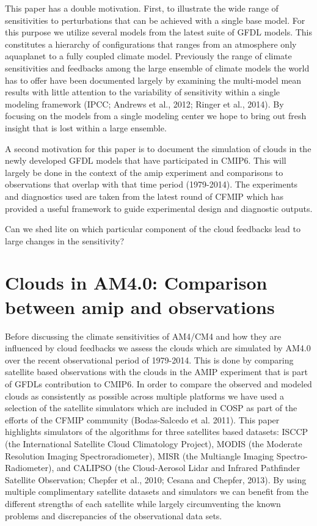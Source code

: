 \documentclass[11pt]{article}   	%
\begin{document}
This paper has a double motivation.  First, to illustrate the wide range of sensitivities to perturbations 
that can be achieved with a single base model.  For this purpose we utilize several models from the latest suite of GFDL 
models.  This constitutes a hierarchy of configurations that ranges from an atmosphere only aquaplanet to a fully coupled 
climate model.  Previously the range of climate sensitivities and feedbacks among the large ensemble of climate models 
the world has to offer have been documented largely by examining the multi-model mean results with little attention to 
the variability of sensitivity within a single modeling framework (IPCC; Andrews et al., 2012; Ringer et al., 2014).  By 
focusing on the models from a single modeling center we hope to bring out fresh insight that is lost within a large ensemble.

A second motivation for this paper is to document the simulation of clouds in the newly developed GFDL models that 
have participated in CMIP6.  This will largely be done in the context of the amip experiment and comparisons to observations
that overlap with that time period (1979-2014).  The experiments and diagnostics used are taken from the latest 
round of CFMIP which has provided a useful framework to guide experimental design and diagnostic outputs.       

Can we shed lite on which particular component of the cloud feedbacks lead to large changes in the sensitivity?  

\section{Clouds in AM4.0: Comparison between amip and observations}

Before discussing the climate sensitivities of AM4/CM4 and how they are influenced by cloud feedbacks we assess
the clouds which are simulated by AM4.0 over the recent observational period of 1979-2014.  This is done by comparing
satellite based observations with the clouds in the AMIP experiment that is part of GFDLs contribution to CMIP6.  In 
order to compare the observed and modeled clouds as consistently as possible across multiple platforms we have 
used a selection of the satellite simulators which are included in COSP as part of the efforts of the CFMIP community 
(Bodas-Salcedo et al. 2011).  This paper highlights simulators of the algorithms for three satellites based datasets: 
ISCCP (the International Satellite Cloud Climatology Project), MODIS (the Moderate Resolution Imaging Spectroradiometer), 
MISR (the Multiangle Imaging Spectro-Radiometer), and CALIPSO (the Cloud-Aerosol Lidar and Infrared Pathfinder 
Satellite Observation; Chepfer et al., 2010; Cesana and Chepfer, 2013).  By using multiple complimentary satellite 
datasets and simulators we can benefit from 
the different strengths of each satellite while largely circumventing the known problems and discrepancies of the 
observational data sets.      
\end{document}
